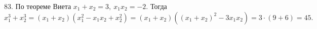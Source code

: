 83. По теореме Виета $x_1+x_2=3,\ x_1x_2=-2.$ Тогда $x_1^3+x_2^3=(x_1+x_2)(x_1^2-x_1x_2+x_2^2)=(x_1+x_2)((x_1+x_2)^2-3x_1x_2)=3\cdot(9+6)=45.$\\
